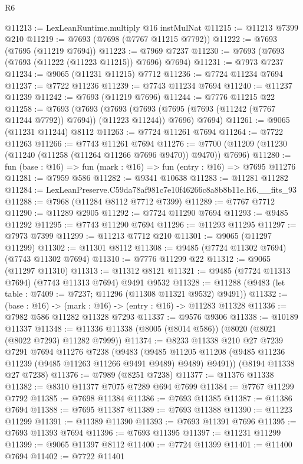 \begin{lexlean}{R6}
\begin{coremodule}
@11213 := LexLeanRuntime.multiply @16 instMulNat
@11215 := @11213 @7399 @210
@11219 := @7693 (@7698 (@7767 @11215 @7792))
@11222 := @7693 (@7695 (@11219 @7694))
@11223 := @7969 @7237
@11230 := @7693 (@7693 (@7693 (@11222 (@11223 @11215)) @7696) @7694)
@11231 := @7973 @7237
@11234 := @9065 (@11231 @11215) @7712
@11236 := @7724 @11234 @7694
@11237 := @7722 @11236
@11239 := @7743 @11234 @7694
@11240 := @11237 @11239
@11242 := @7693 (@11219 @7696)
@11244 := @7776 @11215 @22
@11258 := @7693
    (@7693
      (@7693 (@7693 (@7695 (@7693 (@11242 (@7767 @11244 @7792)) @7694)) (@11223 @11244)) @7696)
      @7694)
@11261 := @9065 (@11231 @11244) @8112
@11263 := @7724 @11261 @7694
@11264 := @7722 @11263
@11266 := @7743 @11261 @7694
@11276 := @7700 (@11209 (@11230 (@11240 (@11258 (@11264 @11266 @7696 @9470)) @9470)) @7696)
@11280 := fun (base : @16) => fun (mark : @16) => fun (entry : @16) => @7695 @11276
@11281 := @7959 @586
@11282 := @9341 @10638
@11283 := @11281 @11282
@11284 := LexLeanPreserve.C59da78af981c7e10f46266c8a8b8b11e.R6.__fits_93
@11288 := @7968 (@11284 @8112 @7712 @7399)
@11289 := @7767 @7712
@11290 := @11289 @2905
@11292 := @7724 @11290 @7694
@11293 := @9485 @11292
@11295 := @7743 @11290 @7694
@11296 := @11293 @11295
@11297 := @7973 @7399
@11299 := @11213 @7712 @210
@11301 := @9065 (@11297 @11299)
@11302 := @11301 @8112
@11308 := @9485 (@7724 @11302 @7694) (@7743 @11302 @7694)
@11310 := @7776 @11299 @22
@11312 := @9065 (@11297 @11310)
@11313 := @11312 @8121
@11321 := @9485 (@7724 @11313 @7694) (@7743 @11313 @7694) @9491 @9532
@11328 := @11288 (@9483 (let table : @7409 := @7237; @11296 (@11308 @11321 @9532) @9491))
@11332 := (base : @16) -> (mark : @16) -> (entry : @16) -> @11283 @11328
@11336 := @7982 @586 @11282 @11328 @7293
@11337 := @9576 @9306
@11338 := @10189 @11337
@11348 := @11336 @11338 (@8005 (@8014 @586)) (@8020 (@8021 (@8022 @7293) @11282 @7999))
@11374 := @8233
    @11338
    @210
    @27
    @7239
    @7291
    @7694
    @11276
    @7238
    (@9483
      (@9485 @11205 @11208 (@9485 @11236 @11239 (@9485 @11263 @11266 @9491 @9489) @9489) @9491))
    (@8194 @11338 @27 @7238)
@11376 := @7989 (@8251 @7238)
@11377 := @11376 @11338
@11382 := @8310 @11377 @7075 @7289 @694 @7699
@11384 := @7767 @11299 @7792
@11385 := @7698 @11384
@11386 := @7693 @11385
@11387 := @11386 @7694
@11388 := @7695 @11387
@11389 := @7693 @11388
@11390 := @11223 @11299
@11391 := @11389 @11390
@11393 := @7693 @11391 @7696
@11395 := @7693 @11393 @7694
@11396 := @7693 @11395
@11397 := @11231 @11299
@11399 := @9065 @11397 @8112
@11400 := @7724 @11399
@11401 := @11400 @7694
@11402 := @7722 @11401

\end{coremodule}
\end{lexlean}
